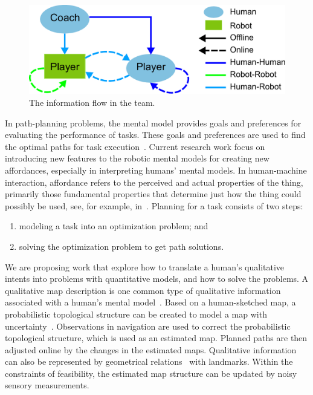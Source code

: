\documentclass[phd]{byuprop}
\begin{document}
\begin{figure}[hbtp]
\centering
\includegraphics[width=0.6\linewidth]{./fig/team_info_flow.pdf}
\caption{The information flow in the team.}
\label{fig:team_info_flow}
\end{figure}

In path-planning problems, the mental model provides goals and preferences for evaluating the performance of tasks.
These goals and preferences are used to find the optimal paths for task execution~\cite{choset2005principles}.
Current research work focus on introducing new features to the robotic mental models for creating new affordances, especially in interpreting humans' mental models.
In human-machine interaction, affordance refers to the perceived and actual properties of the thing, primarily those fundamental properties that determine just how the thing could possibly be used, see, for example, in~\cite{norman2013design}.
Planning for a task consists of two steps:
\begin{enumerate}
\item modeling a task into an optimization problem; and
\item solving the optimization problem to get path solutions.
\end{enumerate}

We are proposing work that explore how to translate a human's qualitative intents into problems with quantitative models, and how to solve the problems.
A qualitative map description is one common type of qualitative information associated with a human's mental model~\cite{kuipers1999}.
Based on a human-sketched map, a probabilistic topological structure can be created to model a map with uncertainty~\cite{Shah2013}.
Observations in navigation are used to correct the probabilistic topological structure, which is used as an estimated map.
Planned paths are then adjusted online by the changes in the estimated maps.
Qualitative information can also be represented by geometrical relations~\cite{mcclelland2012qualitative,mcclelland2014qualitative} with landmarks.
Within the constraints of feasibility, the estimated map structure can be updated by noisy sensory measurements.
\end{document}
